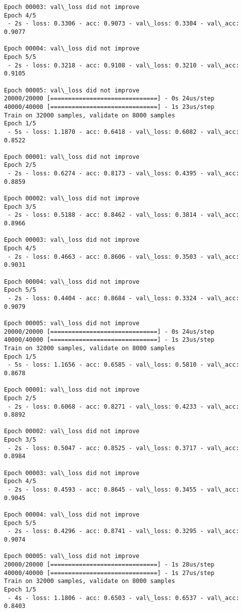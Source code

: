 \documentclass[11pt]{article}
\begin{document}
\begin{Verbatim}[commandchars=\\\{\}]
Epoch 00003: val\_loss did not improve
Epoch 4/5
 - 2s - loss: 0.3306 - acc: 0.9073 - val\_loss: 0.3304 - val\_acc: 0.9077

Epoch 00004: val\_loss did not improve
Epoch 5/5
 - 2s - loss: 0.3218 - acc: 0.9108 - val\_loss: 0.3210 - val\_acc: 0.9105

Epoch 00005: val\_loss did not improve
20000/20000 [==============================] - 0s 24us/step
40000/40000 [==============================] - 1s 23us/step
Train on 32000 samples, validate on 8000 samples
Epoch 1/5
 - 5s - loss: 1.1870 - acc: 0.6418 - val\_loss: 0.6082 - val\_acc: 0.8522

Epoch 00001: val\_loss did not improve
Epoch 2/5
 - 2s - loss: 0.6274 - acc: 0.8173 - val\_loss: 0.4395 - val\_acc: 0.8859

Epoch 00002: val\_loss did not improve
Epoch 3/5
 - 2s - loss: 0.5188 - acc: 0.8462 - val\_loss: 0.3814 - val\_acc: 0.8966

Epoch 00003: val\_loss did not improve
Epoch 4/5
 - 2s - loss: 0.4663 - acc: 0.8606 - val\_loss: 0.3503 - val\_acc: 0.9031

Epoch 00004: val\_loss did not improve
Epoch 5/5
 - 2s - loss: 0.4404 - acc: 0.8684 - val\_loss: 0.3324 - val\_acc: 0.9079

Epoch 00005: val\_loss did not improve
20000/20000 [==============================] - 0s 24us/step
40000/40000 [==============================] - 1s 23us/step
Train on 32000 samples, validate on 8000 samples
Epoch 1/5
 - 5s - loss: 1.1656 - acc: 0.6585 - val\_loss: 0.5810 - val\_acc: 0.8678

Epoch 00001: val\_loss did not improve
Epoch 2/5
 - 2s - loss: 0.6068 - acc: 0.8271 - val\_loss: 0.4233 - val\_acc: 0.8892

Epoch 00002: val\_loss did not improve
Epoch 3/5
 - 2s - loss: 0.5047 - acc: 0.8525 - val\_loss: 0.3717 - val\_acc: 0.8984

Epoch 00003: val\_loss did not improve
Epoch 4/5
 - 2s - loss: 0.4593 - acc: 0.8645 - val\_loss: 0.3455 - val\_acc: 0.9045

Epoch 00004: val\_loss did not improve
Epoch 5/5
 - 2s - loss: 0.4296 - acc: 0.8741 - val\_loss: 0.3295 - val\_acc: 0.9074

Epoch 00005: val\_loss did not improve
20000/20000 [==============================] - 1s 28us/step
40000/40000 [==============================] - 1s 27us/step
Train on 32000 samples, validate on 8000 samples
Epoch 1/5
 - 4s - loss: 1.1806 - acc: 0.6503 - val\_loss: 0.6537 - val\_acc: 0.8403


\end{Verbatim}
\end{document}
